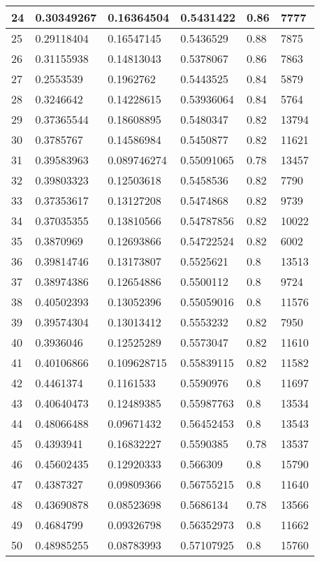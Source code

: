 \begin{longtable}{|l|l|l|l|l|l|}
24 & 0.30349267 & 0.16364504 & 0.5431422 & 0.86 & 7777 \\ \hline 
25 & 0.29118404 & 0.16547145 & 0.5436529 & 0.88 & 7875 \\ \hline 
26 & 0.31155938 & 0.14813043 & 0.5378067 & 0.86 & 7863 \\ \hline 
27 & 0.2553539 & 0.1962762 & 0.5443525 & 0.84 & 5879 \\ \hline 
28 & 0.3246642 & 0.14228615 & 0.53936064 & 0.84 & 5764 \\ \hline 
29 & 0.37365544 & 0.18608895 & 0.5480347 & 0.82 & 13794 \\ \hline 
30 & 0.3785767 & 0.14586984 & 0.5450877 & 0.82 & 11621 \\ \hline 
31 & 0.39583963 & 0.089746274 & 0.55091065 & 0.78 & 13457 \\ \hline 
32 & 0.39803323 & 0.12503618 & 0.5458536 & 0.82 & 7790 \\ \hline 
33 & 0.37353617 & 0.13127208 & 0.5474868 & 0.82 & 9739 \\ \hline 
34 & 0.37035355 & 0.13810566 & 0.54787856 & 0.82 & 10022 \\ \hline 
35 & 0.3870969 & 0.12693866 & 0.54722524 & 0.82 & 6002 \\ \hline 
36 & 0.39814746 & 0.13173807 & 0.5525621 & 0.8 & 13513 \\ \hline 
37 & 0.38974386 & 0.12654886 & 0.5500112 & 0.8 & 9724 \\ \hline 
38 & 0.40502393 & 0.13052396 & 0.55059016 & 0.8 & 11576 \\ \hline 
39 & 0.39574304 & 0.13013412 & 0.5553232 & 0.82 & 7950 \\ \hline 
40 & 0.3936046 & 0.12525289 & 0.5573047 & 0.82 & 11610 \\ \hline 
41 & 0.40106866 & 0.109628715 & 0.55839115 & 0.82 & 11582 \\ \hline 
42 & 0.4461374 & 0.1161533 & 0.5590976 & 0.8 & 11697 \\ \hline 
43 & 0.40640473 & 0.12489385 & 0.55987763 & 0.8 & 13534 \\ \hline 
44 & 0.48066488 & 0.09671432 & 0.56452453 & 0.8 & 13543 \\ \hline 
45 & 0.4393941 & 0.16832227 & 0.5590385 & 0.78 & 13537 \\ \hline 
46 & 0.45602435 & 0.12920333 & 0.566309 & 0.8 & 15790 \\ \hline 
47 & 0.4387327 & 0.09809366 & 0.56755215 & 0.8 & 11640 \\ \hline 
48 & 0.43690878 & 0.08523698 & 0.5686134 & 0.78 & 13566 \\ \hline 
49 & 0.4684799 & 0.09326798 & 0.56352973 & 0.8 & 11662 \\ \hline 
50 & 0.48985255 & 0.08783993 & 0.57107925 & 0.8 & 15760 \\ \hline 
\end{longtable}